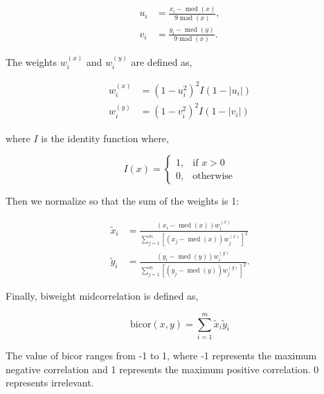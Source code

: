 \documentclass[a4paper]{article}
\begin{document}
\begin{equation}
\begin{align}
u_i &= \frac{x_i - \operatorname{med}(x)}{9 \operatorname{mad}(x)},\\
v_i &= \frac{y_i - \operatorname{med}(y)}{9 \operatorname{mad}(x)}.
\end{align}
\end{equation}

The weights $w_i^{(x)}$ and $w_i^{(y)}$  are defined as,

\begin{equation}
\begin{align}
w_i^{(x)} &= \left(1-u_i^2\right)^2 I\left(1-|u_i|\right)\\
w_i^{(y)} &= \left(1-v_i^2\right)^2 I\left(1-|v_i|\right)
\end{align}
\end{equation}

where $I$ is the identity function where,

\begin{equation}
I(x) = \begin{cases}1, & \text{if } x >0\\
0, & \text{otherwise}\end{cases}
\end{equation}

Then we normalize so that the sum of the weights is 1:

\begin{equation}
\begin{align}
\tilde{x}_i &= \frac{\left(x_i - \operatorname{med}(x)\right) w_i^{(x)}}{\sum_{j=1}^m \left[(x_j -\operatorname{med}(x)) w_j^{(x)}\right]^2}\\
\tilde{y}_i &= \frac{\left(y_i - \operatorname{med}(y)\right) w_i^{(y)}}{\sum_{j=1}^m \left[(y_j -\operatorname{med}(y)) w_j^{(y)}\right]^2}.
\end{align}
\end{equation}

Finally, biweight midcorrelation is defined as,

\begin{equation}
\mathrm{bicor}\left(x, y\right) = \sum_{i=1}^m \tilde{x}_i \tilde{y}_i
\end{equation}

The value of bicor ranges from -1 to 1, where -1 represents the maximum negative correlation and 1 represents the maximum positive correlation. 0 represents irrelevant.


\end{document}
